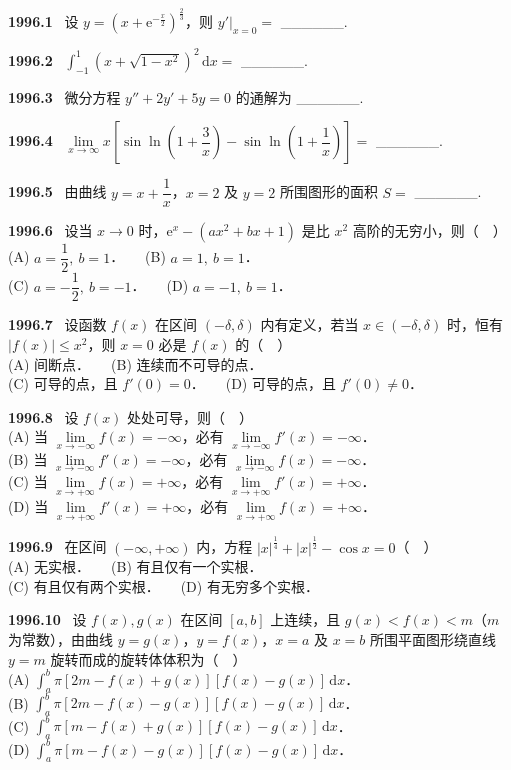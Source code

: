 \documentclass[UTF8,12pt]{ctexart}
\newcommand{\qn}[1]{\textbf{\large #1}\ }
\begin{document}
\qn{1996.1}
设 $y=(x+\mathrm{e}^{-\frac{x}{2}})^{\frac{2}{3}}$，则 $\left.y'\right|_{x=0}=$ ______.

\vfill
\newpage
\qn{1996.2}
$\int_{-1}^{1}(x+\sqrt{1-x^2})^2\,\mathrm{d}x=$ ______.

\vfill
\newpage
\qn{1996.3}
微分方程 $y''+2y'+5y=0$ 的通解为 ______.

\vfill
\newpage
\qn{1996.4}
$\lim\limits_{x\to\infty}x\left[\sin\ln\left(1+\dfrac{3}{x}\right)-\sin\ln\left(1+\dfrac{1}{x}\right)\right]=$ ______.

\vfill
\newpage
\qn{1996.5}
由曲线 $y=x+\dfrac{1}{x}$，$x=2$ 及 $y=2$ 所围图形的面积 $S=$ ______.

\vfill
\newpage
\qn{1996.6}
设当 $x\to 0$ 时，$\mathrm{e}^x-(ax^2+bx+1)$ 是比 $x^2$ 高阶的无穷小，则（　）
\\
\noindent (A) $a=\dfrac{1}{2},\ b=1$．　　(B) $a=1,\ b=1$．
\\
\noindent (C) $a=-\dfrac{1}{2},\ b=-1$．　　(D) $a=-1,\ b=1$．

\vfill
\newpage
\qn{1996.7}
设函数 $f(x)$ 在区间 $(-\delta,\delta)$ 内有定义，若当 $x\in(-\delta,\delta)$ 时，恒有 $|f(x)|\leqslant x^2$，则 $x=0$ 必是 $f(x)$ 的（　）
\\
\noindent (A) 间断点．　　(B) 连续而不可导的点．
\\
\noindent (C) 可导的点，且 $f'(0)=0$．　　(D) 可导的点，且 $f'(0)\neq 0$．

\vfill
\newpage
\qn{1996.8}
设 $f(x)$ 处处可导，则（　）
\\
\noindent (A) 当 $\lim\limits_{x\to-\infty}f(x)=-\infty$，必有 $\lim\limits_{x\to-\infty}f'(x)=-\infty$．
\\
\noindent (B) 当 $\lim\limits_{x\to-\infty}f'(x)=-\infty$，必有 $\lim\limits_{x\to-\infty}f(x)=-\infty$．
\\
\noindent (C) 当 $\lim\limits_{x\to+\infty}f(x)=+\infty$，必有 $\lim\limits_{x\to+\infty}f'(x)=+\infty$．
\\
\noindent (D) 当 $\lim\limits_{x\to+\infty}f'(x)=+\infty$，必有 $\lim\limits_{x\to+\infty}f(x)=+\infty$．

\vfill
\newpage
\qn{1996.9}
在区间 $(-\infty,+\infty)$ 内，方程 $|x|^{\frac{1}{4}}+|x|^{\frac{1}{2}}-\cos x=0$（　）
\\
\noindent (A) 无实根．　　(B) 有且仅有一个实根．
\\
\noindent (C) 有且仅有两个实根．　　(D) 有无穷多个实根．

\vfill
\newpage
\qn{1996.10}
设 $f(x),g(x)$ 在区间 $[a,b]$ 上连续，且 $g(x)<f(x)<m$（$m$ 为常数），由曲线 $y=g(x)$，$y=f(x)$，$x=a$ 及 $x=b$ 所围平面图形绕直线 $y=m$ 旋转而成的旋转体体积为（　）
\\
\noindent (A) $\displaystyle\int_a^b\pi[2m-f(x)+g(x)][f(x)-g(x)]\,\mathrm{d}x$．
\\
\noindent (B) $\displaystyle\int_a^b\pi[2m-f(x)-g(x)][f(x)-g(x)]\,\mathrm{d}x$．
\\
\noindent (C) $\displaystyle\int_a^b\pi[m-f(x)+g(x)][f(x)-g(x)]\,\mathrm{d}x$．
\\
\noindent (D) $\displaystyle\int_a^b\pi[m-f(x)-g(x)][f(x)-g(x)]\,\mathrm{d}x$．
\end{document}
